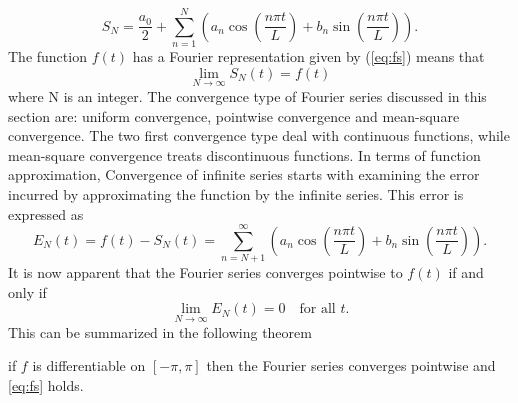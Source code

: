 \documentclass[../Main/thesis.tex]{subfiles}
\begin{document}
\begin{equation}\label{ps}
	S_{N} = \frac{a_{0}}{2} +\sum_{n=1}^{N}\left( a_{n} \cos\left( \frac{n\pi t}{L}\right) + b_{n} \sin\left( \frac{n\pi t}{L}\right)  \right).
\end{equation}
The function $f(t)$ has a Fourier representation given by (\ref{eq:fs}) means that 
\begin{equation}
\lim_{N\rightarrow\infty}S_{N}(t)= f(t)
\end{equation}
where N is an integer. The convergence type of Fourier series discussed in this section are: uniform convergence, pointwise convergence and mean-square convergence. The two first convergence type deal with continuous functions, while mean-square convergence treats discontinuous functions.
\justify
In terms of function approximation, Convergence of infinite series starts with examining the error incurred by approximating the function by the infinite series. This error is expressed as 
\begin{equation}
E_{N}(t) = f(t)-S_{N}(t) = \sum_{n=N+1}^{\infty}\left( a_{n} \cos\left( \frac{n\pi t}{L}\right) + b_{n} \sin\left( \frac{n\pi t}{L}\right)  \right).
\end{equation} 
It is now apparent that the Fourier series converges pointwise to $f(t)$ if and only if 
\begin{equation}
\lim_{N\rightarrow\infty}E_{N}(t)= 0\quad \text{for all $t$}.
\end{equation}
This can be summarized in the following theorem
\begin{theorem}
	if $f$ is differentiable on $[-\pi, \pi]$ then the Fourier series converges pointwise
	and \ref{eq:fs} holds.
\end{theorem}
\end{document}
